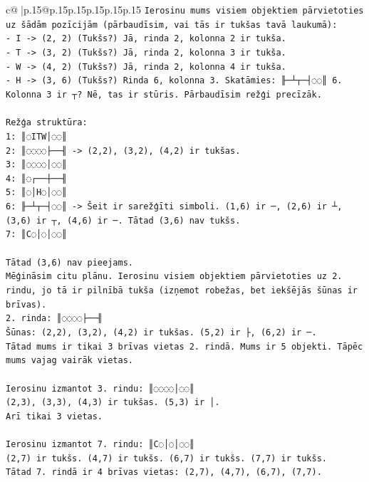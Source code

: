 \documentclass{article}
\begin{document}
{\begin{supertabular}{c@{$\;$}|p{.15\linewidth}@{}p{.15\linewidth}p{.15\linewidth}p{.15\linewidth}p{.15\linewidth}p{.15\linewidth}}
{{{\texttt{Ierosinu mums visiem objektiem pārvietoties uz šādām pozīcijām (pārbaudīsim, vai tās ir tukšas tavā laukumā):} \\
\texttt{{-} I {-}> (2, 2) (Tukšs?) Jā, rinda 2, kolonna 2 ir tukša.} \\
\texttt{{-} T {-}> (3, 2) (Tukšs?) Jā, rinda 2, kolonna 3 ir tukša.} \\
\texttt{{-} W {-}> (4, 2) (Tukšs?) Jā, rinda 2, kolonna 4 ir tukša.} \\
\texttt{{-} H {-}> (3, 6) (Tukšs?) Rinda 6, kolonna 3. Skatāmies: ╟─┴┬─┤◌◌║ 6. Kolonna 3 ir ┬? Nē, tas ir stūris. Pārbaudīsim režģi precīzāk.} \\
\\ 
\texttt{Režģa struktūra:} \\
\texttt{1: ║◌ITW│◌◌║} \\
\texttt{2: ║◌◌◌◌├──╢ {-}> (2,2), (3,2), (4,2) ir tukšas.} \\
\texttt{3: ║◌◌◌◌│◌◌║} \\
\texttt{4: ║◌┌──┼──╢} \\
\texttt{5: ║◌│H◌│◌◌║} \\
\texttt{6: ╟─┴┬─┤◌◌║ {-}> Šeit ir sarežģīti simboli. (1,6) ir ─, (2,6) ir ┴, (3,6) ir ┬, (4,6) ir ─. Tātad (3,6) nav tukšs.} \\
\texttt{7: ║C◌│◌│◌◌║} \\
\\ 
\texttt{Tātad (3,6) nav pieejams.} \\
\texttt{Mēģināsim citu plānu. Ierosinu visiem objektiem pārvietoties uz 2. rindu, jo tā ir pilnībā tukša (izņemot robežas, bet iekšējās šūnas ir brīvas).} \\
\texttt{2. rinda: ║◌◌◌◌├──╢} \\
\texttt{Šūnas: (2,2), (3,2), (4,2) ir tukšas. (5,2) ir ├, (6,2) ir ─.} \\
\texttt{Tātad mums ir tikai 3 brīvas vietas 2. rindā. Mums ir 5 objekti. Tāpēc mums vajag vairāk vietas.} \\
\\ 
\texttt{Ierosinu izmantot 3. rindu: ║◌◌◌◌│◌◌║} \\
\texttt{(2,3), (3,3), (4,3) ir tukšas. (5,3) ir │.} \\
\texttt{Arī tikai 3 vietas.} \\
\\ 
\texttt{Ierosinu izmantot 7. rindu: ║C◌│◌│◌◌║} \\
\texttt{(2,7) ir tukšs. (4,7) ir tukšs. (6,7) ir tukšs. (7,7) ir tukšs.} \\
\texttt{Tātad 7. rindā ir 4 brīvas vietas: (2,7), (4,7), (6,7), (7,7).} \\
}}}
\end{supertabular}}
\end{document}
